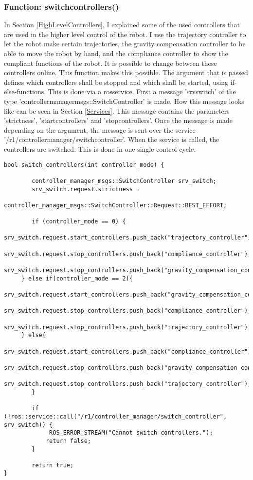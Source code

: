 \documentclass[11pt,a4paper]{report}
\begin{document}
\subsubsection{Function: switch\textunderscore controllers()}\label{SwitchControllers}
In Section \ref{HighLevelControllers}, I explained some of the used controllers that are used in the higher level control of the robot. I use the trajectory controller to let the robot make certain trajectories, the gravity compensation controller to be able to move the robot by hand, and the compliance controller to show the compliant functions of the robot. It is possible to change between these controllers online. This function makes this possible.
The argument that is passed defines which controllers shall be stopped and which shall be started, using if-else-functions. This is done via a rosservice. First a message 'srv\textunderscore switch' of the type 'controller\textunderscore manager\textunderscore msgs::SwitchController' is made. How this message looks like can be seen in Section \ref{Services}. This message contains the parameters 'strictness', 'start\textunderscore controllers' and 'stop\textunderscore controllers'. Once the message is made depending on the argument, the message is sent over the service '/r1/controller\textunderscore manager/switch\textunderscore controller'.
When the service is called, the controllers are switched. This is done in one single control cycle.
\begin{verbatim}
bool switch_controllers(int controller_mode) {

    	controller_manager_msgs::SwitchController srv_switch;
    	srv_switch.request.strictness =
    	controller_manager_msgs::SwitchController::Request::BEST_EFFORT;
    	
    	if (controller_mode == 0) {
       	srv_switch.request.start_controllers.push_back("trajectory_controller");
       	srv_switch.request.stop_controllers.push_back("compliance_controller");
        srv_switch.request.stop_controllers.push_back("gravity_compensation_controller");
   	 } else if(controller_mode == 2){
        srv_switch.request.start_controllers.push_back("gravity_compensation_controller");
        srv_switch.request.stop_controllers.push_back("compliance_controller");
		        srv_switch.request.stop_controllers.push_back("trajectory_controller");
     } else{
		        srv_switch.request.start_controllers.push_back("compliance_controller");
        srv_switch.request.stop_controllers.push_back("gravity_compensation_controller");
		        srv_switch.request.stop_controllers.push_back("trajectory_controller");
    	}
    	
    	if (!ros::service::call("/r1/controller_manager/switch_controller", srv_switch)) {
       		 ROS_ERROR_STREAM("Cannot switch controllers.");
        	return false;
    	}
    	
    	return true;
}
\end{verbatim}
\newpage
\end{document}
